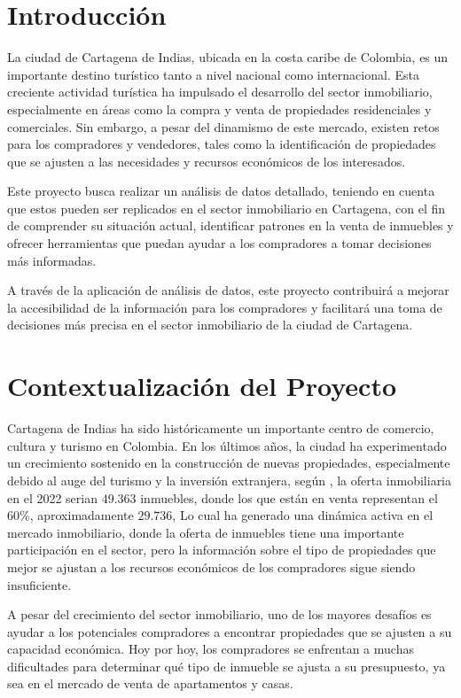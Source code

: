 \documentclass[12pt,a4paper]{article}
\begin{document}
\newpage

\section{Introducción}
La ciudad de Cartagena de Indias, ubicada en la costa caribe de Colombia, es un importante destino turístico tanto a nivel nacional como internacional. Esta creciente actividad turística ha impulsado el desarrollo del sector inmobiliario, especialmente en áreas como la compra y venta de propiedades residenciales y comerciales. Sin embargo, a pesar del dinamismo de este mercado, existen retos para los compradores y vendedores, tales como la identificación de propiedades que se ajusten a las necesidades y recursos económicos de los interesados.

Este proyecto busca realizar un análisis de datos detallado, teniendo en cuenta que estos pueden ser replicados\citep{borjas2020validez} en el sector inmobiliario en Cartagena, con el fin de comprender su situación actual, identificar patrones en la venta de inmuebles y ofrecer herramientas que puedan ayudar a los compradores a tomar decisiones más informadas.

A través de la aplicación de análisis de datos, este proyecto contribuirá a mejorar la accesibilidad de la información para los compradores y facilitará una toma de decisiones más precisa en el sector inmobiliario de la ciudad de Cartagena.

\section{Contextualización del Proyecto}
Cartagena de Indias ha sido históricamente un importante centro de comercio, cultura y turismo en Colombia. En los últimos años, la ciudad ha experimentado un crecimiento sostenido en la construcción de nuevas propiedades, especialmente debido al auge del turismo y la inversión extranjera, según \citep{go2023}, la oferta inmobiliaria en el 2022 serian $49.363$ inmuebles, donde los que están en venta representan el 60\%, aproximadamente $29.736$, Lo cual ha generado una dinámica activa en el mercado inmobiliario, donde la oferta de inmuebles tiene una importante participación en el sector, pero la información sobre el tipo de propiedades que mejor se ajustan a los recursos económicos de los compradores sigue siendo insuficiente.

A pesar del crecimiento del sector inmobiliario, uno de los mayores desafíos es ayudar a los potenciales compradores a encontrar propiedades que se ajusten a su capacidad económica. Hoy por hoy, los compradores se enfrentan a muchas dificultades para determinar qué tipo de inmueble se ajusta a su presupuesto, ya sea en el mercado de venta de apartamentos y casas.
\end{document}
